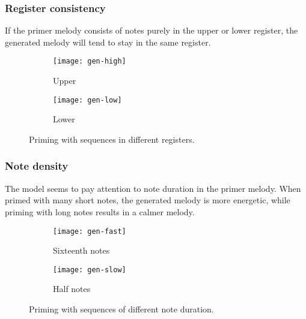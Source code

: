 \documentclass[../../report.tex]{subfiles}
\begin{document}
\subsubsection{Register consistency}
If the primer melody consists of notes purely in the upper or lower register,
the generated melody will tend to stay in the same register.

\begin{figure}[h]
  \begin{subfigure}[b]{\textwidth}
    \texttt{[image: gen-high]}
    \caption{Upper}
    \vspace{1mm}
  \end{subfigure}
  \begin{subfigure}[b]{\textwidth}
    \texttt{[image: gen-low]}
    \caption{Lower}
  \end{subfigure}
  \caption{Priming with sequences in different registers.}
\end{figure}

\subsubsection{Note density}
The model seems to pay attention to note duration in the primer melody. When
primed with many short notes, the generated melody is more energetic, while
priming with long notes results in a calmer melody.

\begin{figure}[h]
  \begin{subfigure}[b]{\textwidth}
    \texttt{[image: gen-fast]}
    \caption{Sixteenth notes}
    \vspace{1mm}
  \end{subfigure}
  \begin{subfigure}[b]{\textwidth}
    \texttt{[image: gen-slow]}
    \caption{Half notes}
  \end{subfigure}
  \caption{Priming with sequences of different note duration.}
\end{figure}
\end{document}
